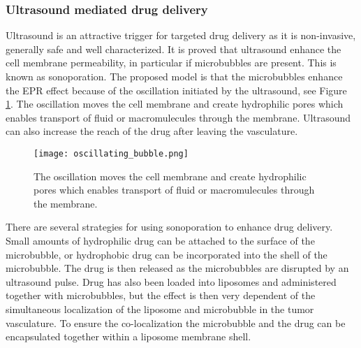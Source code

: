 \subsubsection{Ultrasound mediated drug delivery}
\label{sec:umdd}
Ultrasound is an attractive trigger for targeted drug delivery as it is non-invasive, generally safe and well characterized. It is proved that ultrasound enhance the cell membrane permeability, in particular if microbubbles are present\cite{VanWamel2006a}. This is known as sonoporation. The proposed model is that the microbubbles enhance the EPR effect because of the oscillation initiated by the ultrasound, see Figure \ref{Fig:oscillating_bubble}. The oscillation moves the cell membrane and create hydrophilic pores which enables transport of fluid or macromulecules through the membrane\cite{VanWamel2006a}. Ultrasound can also increase the reach of the drug after leaving the vasculature\cite{Eggen2013}.

\begin{figure}[h]
  \centering
  \label{Fig:oscillating_bubble}
  \texttt{[image: oscillating\_bubble.png]}
  \caption{The oscillation moves the cell membrane and create hydrophilic pores which enables transport of fluid or macromulecules through the membrane\cite{VanWamel2006a}.}
\end{figure}


There are several strategies for using sonoporation to enhance drug delivery. Small amounts of hydrophilic drug can be attached to the surface of the microbubble, or hydrophobic drug can be incorporated into the shell of the microbubble. The drug is then released as the microbubbles are disrupted by an ultrasound pulse\cite{Liu2006}. Drug has also been loaded into liposomes and administered together with microbubbles, but the effect is then very dependent of the simultaneous localization of the liposome and microbubble in the tumor vasculature. To ensure the co-localization the microbubble and the drug can be encapsulated together within a liposome membrane shell\cite{Ibsen2011}.


  


